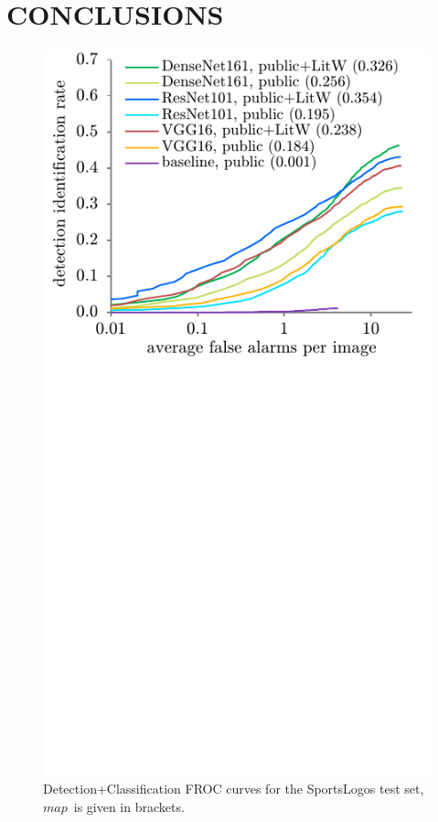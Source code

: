 \documentclass[a4paper,twoside]{article}
\newcommand{\map}{$\mathit{map}$}
\begin{document}
\section{\uppercase{Conclusions}}
\label{sec:conclusion}
%
\begin{figure}%
\centering%
\includegraphics[width=\linewidth, trim=0cm 8.5cm 0cm 0cm, clip]{img/classificationFrocFootball.pdf}%
\caption{Detection+Classification FROC curves for the Sports\-Logos test set, \map~is given in brackets.}%
\label{fig:classificationFrocFootball}
\end{figure}%
\end{document}

